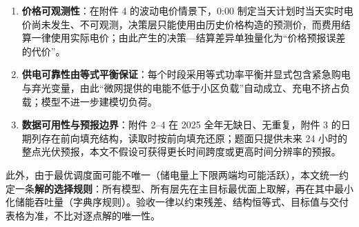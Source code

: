\begin{enumerate}[leftmargin=2.4em,itemsep=2pt]
  \item \textbf{价格可观测性}：在附件 4 的波动电价情景下，0:00 制定当天计划时当天实时电价尚未发生、不可观测，决策层只能使用由历史价格构造的预测价，而费用结算一律使用实际电价；由此产生的决策—结算差异单独量化为“价格预报误差的代价”。
  \item \textbf{供电可靠性由等式平衡保证}：每个时段采用等式功率平衡并显式包含紧急购电与弃光变量，由此“微网提供的电能不低于小区负载”自动成立、充电不挤占负载；模型不进一步建模切负荷。
  \item \textbf{数据可用性与预报边界}：附件 2--4 在 2025 全年无缺日、无重复，附件 3 的日期列存在前向填充结构，读取时按前向填充还原；题面只提供未来 24 小时的整点光伏预报，本文不假设可获得更长时间跨度或更高时间分辨率的预报。
\end{enumerate}

此外，由于最优调度面可能不唯一（储电量上下限两端均可能活跃），本文统一约定一条\textbf{解的选择规则}：所有模型、所有层先在主目标最优面上取解，再在其中最小化储能吞吐量（字典序规则）。验收一律以约束残差、结构恒等式、目标值与交付表格为准，不比对逐点解的唯一性。
